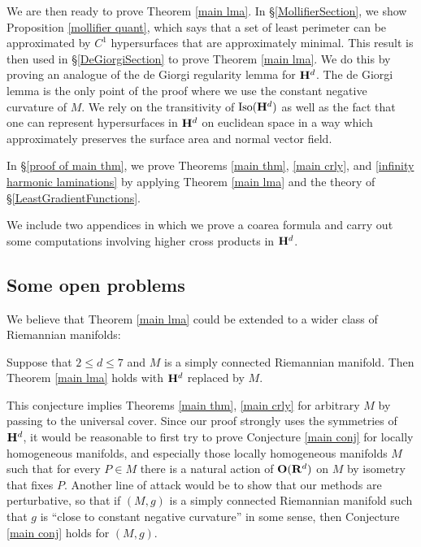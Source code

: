 We are then ready to prove Theorem \ref{main lma}.
In \S\ref{MollifierSection}, we show Proposition \ref{mollifier quant}, which says that a set of least perimeter can be approximated by $C^1$ hypersurfaces that are approximately minimal.
This result is then used in \S\ref{DeGiorgiSection} to prove Theorem \ref{main lma}. We do this by proving an analogue of the de Giorgi regularity lemma \cite[Teorema 5.7]{Miranda66} for $\mathbf H^d$. The de Giorgi lemma is the only point of the proof where we use the constant negative curvature of $M$.
We rely on the transitivity of $\operatorname{Iso}(\mathbf H^d)$ as well as the fact that one can represent hypersurfaces in $\mathbf H^d$ on euclidean space in a way which approximately preserves the surface area and normal vector field.

In \S\ref{proof of main thm}, we prove Theorems \ref{main thm}, \ref{main crly}, and \ref{infinity harmonic laminations} by applying Theorem \ref{main lma} and the theory of \S\ref{LeastGradientFunctions}.

We include two appendices in which we prove a coarea formula and carry out some computations involving higher cross products in $\mathbf H^d$.


\subsection{Some open problems}
We believe that Theorem \ref{main lma} could be extended to a wider class of Riemannian manifolds:

\begin{conjecture}\label{main conj}
Suppose that $2 \leq d \leq 7$ and $M$ is a simply connected Riemannian manifold. Then Theorem \ref{main lma} holds with $\mathbf H^d$ replaced by $M$.
\end{conjecture}

This conjecture implies Theorems \ref{main thm}, \ref{main crly} for arbitrary $M$ by passing to the universal cover.
Since our proof strongly uses the symmetries of $\mathbf H^d$, it would be reasonable to first try to prove Conjecture \ref{main conj} for locally homogeneous manifolds, and especially those locally homogeneous manifolds $M$ such that for every $P \in M$ there is a natural action of $\mathbf{O}(\mathbf{R}^d)$ on $M$ by isometry that fixes $P$.
Another line of attack would be to show that our methods are perturbative, so that if $(M, g)$ is a simply connected Riemannian manifold such that $g$ is ``close to constant negative curvature'' in some sense, then Conjecture \ref{main conj} holds for $(M, g)$.

